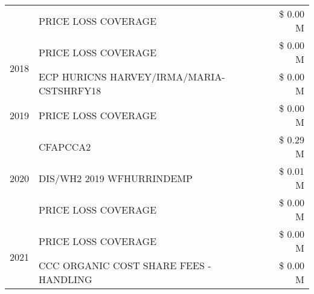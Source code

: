 \begin{tabular}{llr}
 & PRICE LOSS COVERAGE & \$ 0.00 M \\
\cline{1-3}
\multirow[t]{2}{*}{2018} & PRICE LOSS COVERAGE & \$ 0.00 M \\
 & ECP HURICNS HARVEY/IRMA/MARIA-CSTSHRFY18 & \$ 0.00 M \\
\cline{1-3}
2019 & PRICE LOSS COVERAGE & \$ 0.00 M \\
\cline{1-3}
\multirow[t]{3}{*}{2020} & CFAPCCA2 & \$ 0.29 M \\
 & DIS/WH2 2019 WFHURRINDEMP & \$ 0.01 M \\
 & PRICE LOSS COVERAGE & \$ 0.00 M \\
\cline{1-3}
\multirow[t]{2}{*}{2021} & PRICE LOSS COVERAGE & \$ 0.00 M \\
 & CCC ORGANIC COST SHARE FEES - HANDLING & \$ 0.00 M \\
\cline{1-3}
\bottomrule
\end{tabular}
